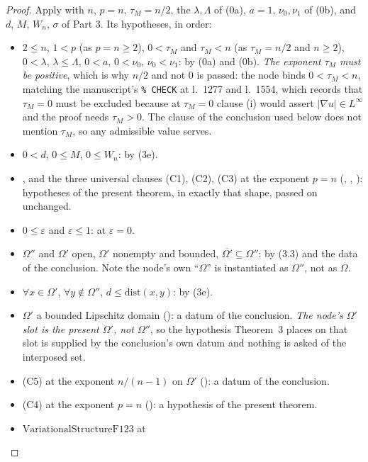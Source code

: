 \begin{proof}
Apply  with $n$, $p=n$, $\tau_M=n/2$, the
$\lambda,\Lambda$ of (0a), $a=1$, $\nu_0,\nu_1$ of (0b), and $d$, $M$, $W_n$,
$\sigma$ of Part 3.  Its hypotheses, in order:
\begin{itemize}
\item $2\le n$, $1<p$ (as $p=n\ge2$), $0<\tau_M$ and $\tau_M<n$ (as
  $\tau_M=n/2$ and $n\ge2$), $0<\lambda$, $\lambda\le\Lambda$, $0<a$, $0<\nu_0$,
  $\nu_0<\nu_1$: by (0a) and (0b).  \emph{The exponent $\tau_M$ must be
  positive}, which is why $n/2$ and not $0$ is passed: the node binds
  $0<\tau_M<n$, matching the manuscript's \verb|% CHECK| at l.~1277 and l.~1554,
  which records that $\tau_M=0$ must be excluded because at $\tau_M=0$ clause (i)
  would assert $|\nabla u|\in L^{\infty}$ and the proof needs $\tau_M>0$.  The
  clause of the conclusion used below does not mention $\tau_M$, so any
  admissible value serves.
\item $0<d$, $0\le M$, $0\le W_n$: by (3e).
\item {}, and the three universal clauses (C1),
  (C2), (C3) at the exponent $p=n$ (,
  , ): hypotheses of the
  present theorem, in exactly that shape, passed on unchanged.
\item $0\le\varepsilon$ and $\varepsilon\le1$: at $\varepsilon=0$.
\item $\Omega''$ and $\Omega'$ open, $\Omega'$ nonempty and bounded,
  $\overline{\Omega'}\subseteq\Omega''$: by (3.3) and the data of the conclusion.
  Note the node's own ``$\Omega$'' is instantiated as $\Omega''$, not as
  $\Omega$.
\item $\forall x\in\Omega'$, $\forall y\notin\Omega''$,
  $d\le\mathrm{dist}(x,y)$: by (3e).
\item $\Omega'$ a bounded Lipschitz domain
  (): a datum of the conclusion.  \emph{The
  node's $\Omega'$ slot is the present $\Omega'$, not $\Omega''$}, so the
  hypothesis Theorem~3 places on that slot is supplied by the conclusion's own
  datum and nothing is asked of the interposed set.
\item (C5) at the exponent $n/(n-1)$ on $\Omega'$
  (): a datum of the conclusion.
\item (C4) at the exponent $p=n$ (): a hypothesis
  of the present theorem.
\item $\mathrm{VariationalStructureF123}$ at

\end{itemize}
\end{proof}
